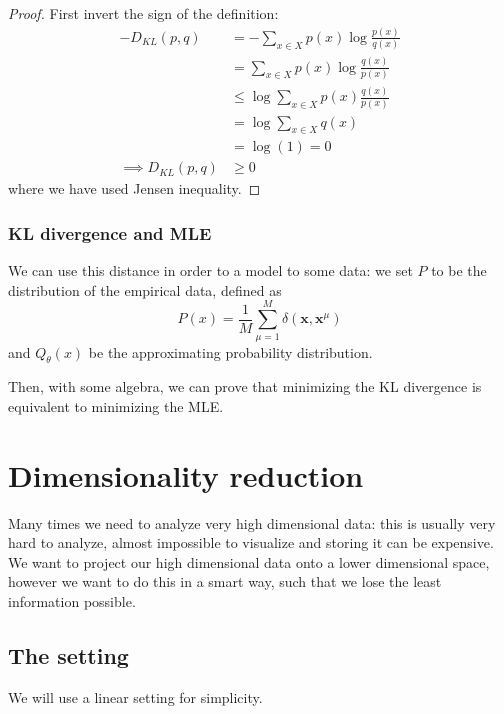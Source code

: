 \documentclass[12pt]{extarticle}
\renewcommand{\vec}[1]{\bm{#1}}
\begin{document}
\begin{proof}
	First invert the sign of the definition:
	\begin{align}
		-D_{KL}(p,q)          & = -\sum_{x \in X} p(x) \log \frac{p(x)}{q(x)}   \\
		                      & = \sum_{x \in X} p(x) \log \frac{q(x)}{p(x)}    \\
		                      & \leq \log \sum_{x \in X} p(x) \frac{q(x)}{p(x)} \\
		                      & = \log \sum_{x \in X} q(x)                      \\
		                      & = \log (1) = 0                                  \\
		\implies D_{KL}(p, q) & \geq 0
	\end{align}
	where we have used Jensen inequality.
\end{proof}

\subsubsection{KL divergence and MLE}

We can use this distance in order to  a model to some data:
we set $P$ to be the distribution of the empirical data, defined as
\begin{equation}
	P(x) = \frac{1}{M} \sum^M_{\mu = 1} \delta(\vec x, \vec x^\mu)
\end{equation}
and $Q_\theta(x)$ be the approximating probability distribution.

Then, with some algebra, we can prove that minimizing the KL divergence is equivalent to minimizing
the MLE.

\section{Dimensionality reduction}

Many times we need to analyze very high dimensional data: this is usually very hard to analyze,
almost impossible to visualize and storing it can be expensive.
We want to project our high dimensional data onto a lower dimensional space, however we want to do
this in a smart way, such that we lose the least information possible.

\subsection{The setting}

We will use a linear setting for simplicity.
\end{document}
